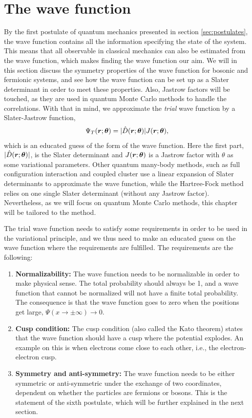\section{The wave function} \label{sec:wavefunction}
By the first postulate of quantum mechanics presented in section \ref{sec:postulates}, the wave function contains all the information specifying the state of the system. This means that all observable in classical mechanics can also be estimated from the wave function, which makes finding the wave function our aim. We will in this section discuss the symmetry properties of the wave function for bosonic and fermionic systems, and see how the wave function can be set up as a Slater determinant in order to meet these properties. Also, Jastrow factors will be touched, as they are used in quantum Monte Carlo methods to handle the correlations. With that in mind, we approximate the \textit{trial} wave function by a Slater-Jastrow function,
\begin{equation}
\Psi_T(\boldsymbol{{r}};\boldsymbol{{\theta}})=|\hat{D}(\boldsymbol{{r}};\boldsymbol{{\theta}})|J(\boldsymbol{{r}};\boldsymbol{{\theta}}),
\end{equation}
which is an educated guess of the form of the wave function. 
Here the first part, $|\hat{D}(\boldsymbol{{r}};\boldsymbol{{\theta}})|$, is the Slater determinant and $J(\boldsymbol{{r}};\boldsymbol{{\theta}})$ is a Jastrow factor with $\theta$ as some variational parameters. Other quantum many-body methods, such as full configuration interaction and coupled cluster use a linear expansion of Slater determinants to approximate the wave function, while the Hartree-Fock method relies on one single Slater determinant (without any Jastrow factor). Nevertheless, as we will focus on quantum Monte Carlo methods, this chapter will be tailored to the method. 

The trial wave function needs to satisfy some requirements in order to be used in the variational principle, and we thus need to make an educated guess on the wave function where the requirements are fulfilled. The requirements are the following:

\begin{enumerate}
	\item \textbf{Normalizability:} The wave function needs to be normalizable in order to make physical sense. The total probability should always be 1, and a wave function that cannot be normalized will not have a finite total probability. The consequence is that the wave function goes to zero when the positions get large, $\Psi(x\rightarrow\pm\infty)\rightarrow 0$. 
	
	\item \textbf{Cusp condition:} The cusp condition (also called the Kato theorem) states that the wave function should have a cusp where the potential explodes. An example on this is when electrons come close to each other, i.e., the electron-electron cusp.
	
	\item \textbf{Symmetry and anti-symmetry:} The wave function needs to be either symmetric or anti-symmetric under the exchange of two coordinates, dependent on whether the particles are fermions or bosons. This is the statement of the sixth postulate, which will be further explained in the next section.
\end{enumerate}

